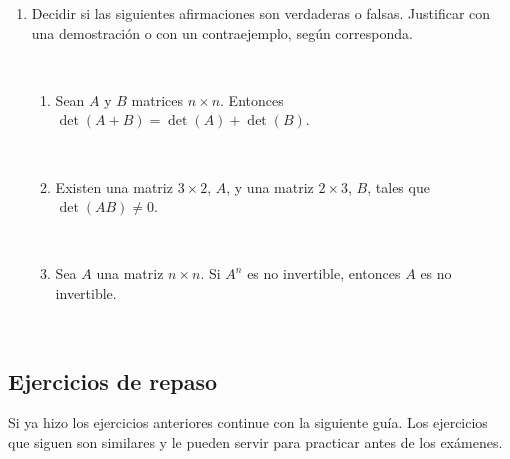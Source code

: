 \documentclass[12pt]{amsart}
\begin{document}
\begin{enumerate}
\

\item Decidir si las siguientes afirmaciones son verdaderas o falsas. Justificar con una demostraci\' on o con un contraejemplo, seg\' un corresponda.

\

\begin{enumerate}
\item Sean $A$ y $B$ matrices $n \times n$. Entonces $\det(A + B) = \det (A) + \det(B)$.

\

\item Existen una matriz $3\times 2$, $A$, y una matriz $2\times 3$, $B$, tales que $\det(AB) \neq 0$.

\

\item Sea $A$ una matriz $n\times n$. Si $A^n$ es no invertible, entonces $A$ es no invertible.
\end{enumerate}




\end{enumerate}



\

\subsection*{Ejercicios de repaso}
Si ya hizo los ejercicios anteriores continue con la siguiente gu\'ia. Los ejercicios que siguen son similares y le pueden servir para practicar antes de los ex\'amenes.

\
\end{document}
